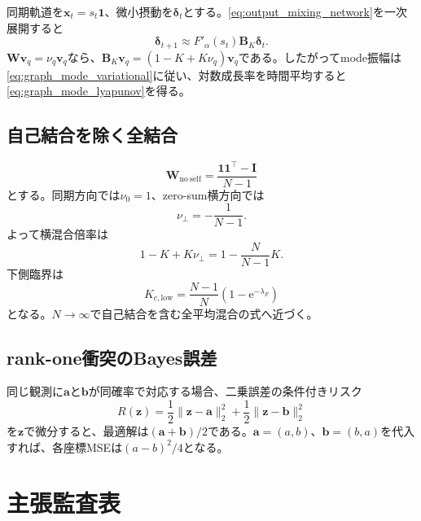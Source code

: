 \documentclass[a4paper,11pt,oneside,openany]{ltjsbook}
\newcommand{\e}{\mathrm{e}}
\newcommand{\ones}{\bm{1}}
\newcommand{\vect}[1]{\bm{#1}}
\newcommand{\mat}[1]{\bm{#1}}
\begin{document}
同期軌道を\(\vect x_t=s_t\ones\)、微小摂動を\(\vect\delta_t\)とする。\cref{eq:output_mixing_network}を一次展開すると
\begin{equation}
  \vect\delta_{t+1}
  \approx F'_\alpha(s_t)\mat B_K\vect\delta_t.
\end{equation}
\(\mat W\vect v_q=\nu_q\vect v_q\)なら、\(\mat B_K\vect v_q=(1-K+K\nu_q)\vect v_q\)である。したがってmode振幅は\cref{eq:graph_mode_variational}に従い、対数成長率を時間平均すると\cref{eq:graph_mode_lyapunov}を得る。

\section{自己結合を除く全結合}

\begin{equation}
  \mat W_{\mathrm{no\ self}}
  =\frac{\ones\ones^\top-\mat I}{N-1}
\end{equation}
とする。同期方向では\(\nu_0=1\)、zero-sum横方向では
\begin{equation}
  \nu_\perp=-\frac1{N-1}.
\end{equation}
よって横混合倍率は
\begin{equation}
  1-K+K\nu_\perp
  =1-\frac{N}{N-1}K.
\end{equation}
下側臨界は
\begin{equation}
  K_{c,\mathrm{low}}
  =\frac{N-1}{N}\left(1-\e^{-\lambda_F}\right)
\end{equation}
となる。\(N\to\infty\)で自己結合を含む全平均混合の式へ近づく。

\section{rank-one衝突のBayes誤差}

同じ観測に\(\vect a\)と\(\vect b\)が同確率で対応する場合、二乗誤差の条件付きリスク
\begin{equation}
  R(\vect z)
  =\frac12\|\vect z-\vect a\|_2^2
   +\frac12\|\vect z-\vect b\|_2^2
\end{equation}
を\(\vect z\)で微分すると、最適解は\((\vect a+\vect b)/2\)である。\(\vect a=(a,b)\)、\(\vect b=(b,a)\)を代入すれば、各座標MSEは\((a-b)^2/4\)となる。

\chapter{主張監査表}
\label{app:audit}
\end{document}
